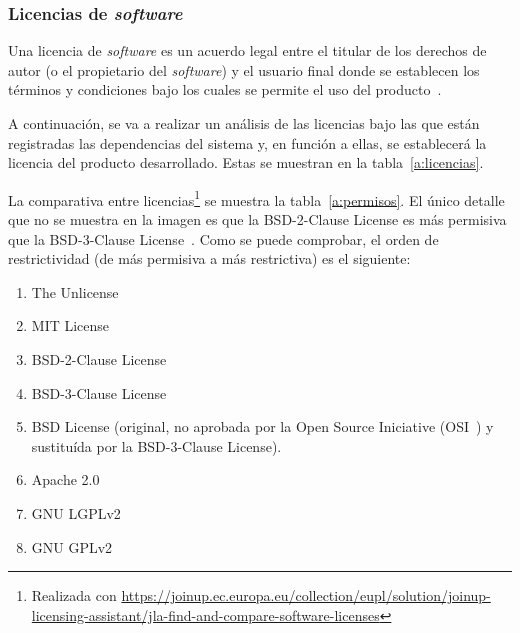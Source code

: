 \subsubsection{Licencias de \textit{software}}

Una licencia de \textit{software} es un acuerdo legal entre el titular de los derechos de autor (o el propietario del \textit{software}) y el usuario final donde se establecen los términos y condiciones bajo los cuales se permite el uso del producto~\cite{licenciaQueEs}.

A continuación, se va a realizar un análisis de las licencias bajo las que están registradas las dependencias del sistema y, en función a ellas, se establecerá la licencia del producto desarrollado. Estas se muestran en la tabla~\ref{a:licencias}.

La comparativa entre licencias\footnote{Realizada con \url{https://joinup.ec.europa.eu/collection/eupl/solution/joinup-licensing-assistant/jla-find-and-compare-software-licenses}} se muestra la tabla~\ref{a:permisos}. El único detalle que no se muestra en la imagen es que la BSD-2-Clause License es más permisiva que la BSD-3-Clause License~\cite{BSD}. Como se puede comprobar, el orden de restrictividad (de más permisiva a más restrictiva) es el siguiente:

\begin{enumerate}
	\item The Unlicense
	\item MIT License
	\item BSD-2-Clause License
	\item BSD-3-Clause License
	\item BSD License (original, no aprobada por la Open Source Iniciative (OSI~\cite{BSD}) y sustituída por la BSD-3-Clause License).
	\item Apache 2.0
	\item GNU LGPLv2
	\item GNU GPLv2
\end{enumerate}


